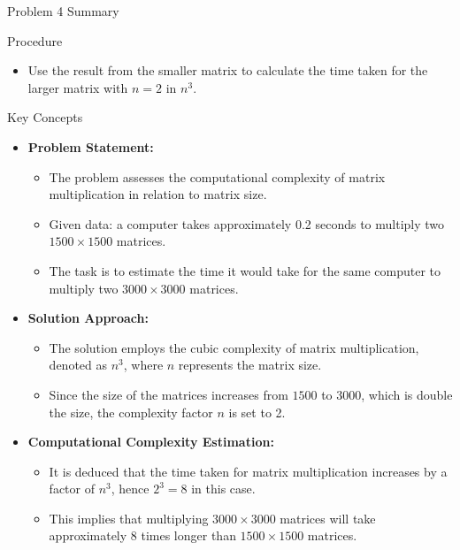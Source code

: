 \begin{summary}{Problem 4 Summary}
    \begin{statement}{Procedure}
        \begin{itemize}
            \item Use the result from the smaller matrix to calculate the time taken for the larger matrix with $n = 2$ in $n^{3}$.
        \end{itemize}
    \end{statement}
    \begin{statement}{Key Concepts}
        \begin{itemize}
            \item \textbf{Problem Statement:}
            \begin{itemize}
                \item The problem assesses the computational complexity of matrix multiplication in relation to matrix size.
                \item Given data: a computer takes approximately 0.2 seconds to multiply two $1500 \times 1500$ matrices.
                \item The task is to estimate the time it would take for the same computer to multiply two $3000 \times 3000$ matrices.
            \end{itemize}
            \item \textbf{Solution Approach:}
            \begin{itemize}
                \item The solution employs the cubic complexity of matrix multiplication, denoted as $n^3$, where $n$ represents the matrix size.
                \item Since the size of the matrices increases from $1500$ to $3000$, which is double the size, the complexity factor $n$ is set to 2.
            \end{itemize}
            \item \textbf{Computational Complexity Estimation:}
            \begin{itemize}
                \item It is deduced that the time taken for matrix multiplication increases by a factor of $n^3$, hence $2^3 = 8$ in this case.
                \item This implies that multiplying $3000 \times 3000$ matrices will take approximately 8 times longer than $1500 \times 1500$ matrices.
            \end{itemize}

\end{itemize}
\end{statement}
\end{summary}
